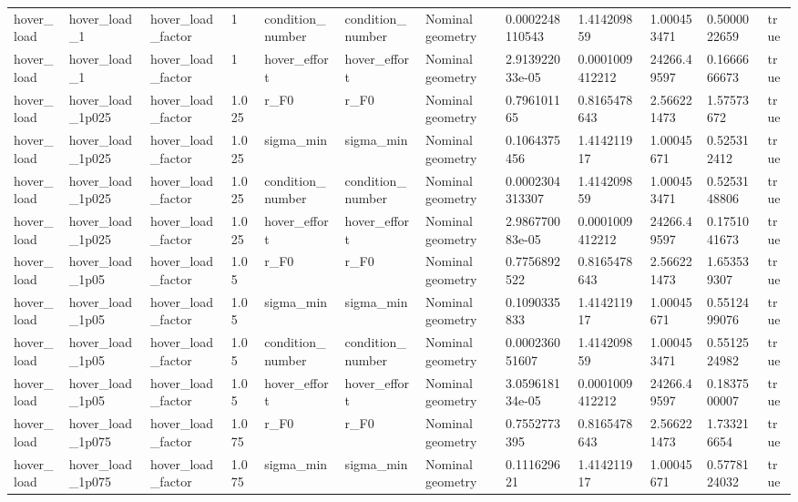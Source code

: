 \begin{tabular}{@{}llllllllllll@{}}
hover\_load & hover\_load\_1 & hover\_load\_factor & 1 & condition\_number & condition\_number & Nominal geometry & 0.0002248110543 & 1.414209859 & 1.000453471 & 0.5000022659 & true \\
hover\_load & hover\_load\_1 & hover\_load\_factor & 1 & hover\_effort & hover\_effort & Nominal geometry & 2.913922033e-05 & 0.0001009412212 & 24266.49597 & 0.1666666673 & true \\
hover\_load & hover\_load\_1p025 & hover\_load\_factor & 1.025 & r\_F0 & r\_F0 & Nominal geometry & 0.796101165 & 0.8165478643 & 2.566221473 & 1.57573672 & true \\
hover\_load & hover\_load\_1p025 & hover\_load\_factor & 1.025 & sigma\_min & sigma\_min & Nominal geometry & 0.1064375456 & 1.414211917 & 1.00045671 & 0.525312412 & true \\
hover\_load & hover\_load\_1p025 & hover\_load\_factor & 1.025 & condition\_number & condition\_number & Nominal geometry & 0.0002304313307 & 1.414209859 & 1.000453471 & 0.5253148806 & true \\
hover\_load & hover\_load\_1p025 & hover\_load\_factor & 1.025 & hover\_effort & hover\_effort & Nominal geometry & 2.986770083e-05 & 0.0001009412212 & 24266.49597 & 0.1751041673 & true \\
hover\_load & hover\_load\_1p05 & hover\_load\_factor & 1.05 & r\_F0 & r\_F0 & Nominal geometry & 0.7756892522 & 0.8165478643 & 2.566221473 & 1.653539307 & true \\
hover\_load & hover\_load\_1p05 & hover\_load\_factor & 1.05 & sigma\_min & sigma\_min & Nominal geometry & 0.1090335833 & 1.414211917 & 1.00045671 & 0.5512499076 & true \\
hover\_load & hover\_load\_1p05 & hover\_load\_factor & 1.05 & condition\_number & condition\_number & Nominal geometry & 0.000236051607 & 1.414209859 & 1.000453471 & 0.5512524982 & true \\
hover\_load & hover\_load\_1p05 & hover\_load\_factor & 1.05 & hover\_effort & hover\_effort & Nominal geometry & 3.059618134e-05 & 0.0001009412212 & 24266.49597 & 0.1837500007 & true \\
hover\_load & hover\_load\_1p075 & hover\_load\_factor & 1.075 & r\_F0 & r\_F0 & Nominal geometry & 0.7552773395 & 0.8165478643 & 2.566221473 & 1.733216654 & true \\
hover\_load & hover\_load\_1p075 & hover\_load\_factor & 1.075 & sigma\_min & sigma\_min & Nominal geometry & 0.111629621 & 1.414211917 & 1.00045671 & 0.5778124032 & true \\

\end{tabular}
